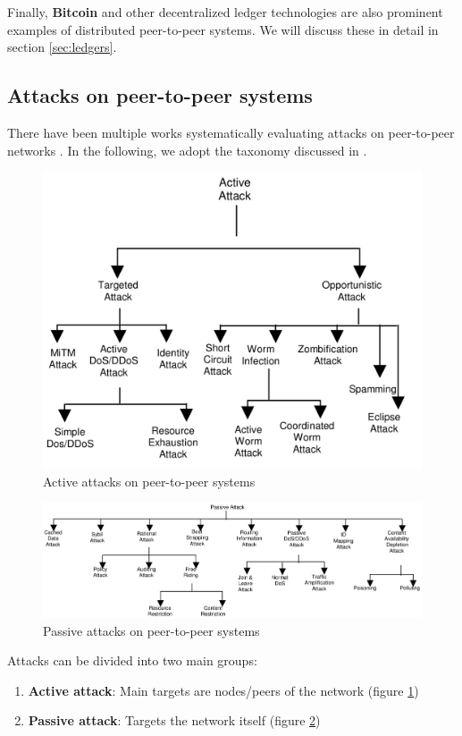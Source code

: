 \documentclass[12pt]{article}
\begin{document}
Finally, \textbf{Bitcoin} \cite{Nakamoto2008} and other decentralized ledger technologies are also prominent examples of distributed peer-to-peer systems. We will discuss these in detail in section \ref{sec:ledgers}.

\subsection{Attacks on peer-to-peer systems}

There have been multiple works systematically evaluating attacks on peer-to-peer networks \cite{P2PSecurityTaxonomy} \cite{P2PAttacks} \cite{P2PAttacks2}. In the following, we adopt the taxonomy discussed in \cite{P2PSecurityTaxonomy}.

\begin{figure}[h!]
\centering
\includegraphics[width=0.6\columnwidth]{images/p2p-active-attack.png}
\caption{Active attacks on peer-to-peer systems \cite{P2PSecurityTaxonomy}}
\label{fig:p2p-active}
\end{figure}

\begin{figure}
\centering
\includegraphics[width=1\columnwidth]{images/p2p-passive.png}
\caption{Passive attacks on peer-to-peer systems \cite{P2PSecurityTaxonomy}}
\label{fig:p2p-passive}
\end{figure}

Attacks can be divided into two main groups:

\begin{enumerate}
    \item \textbf{Active attack}: Main targets are nodes/peers of the network (figure \ref{fig:p2p-active})
    \item \textbf{Passive attack}: Targets the network itself (figure \ref{fig:p2p-passive})
\end{enumerate}
\end{document}
